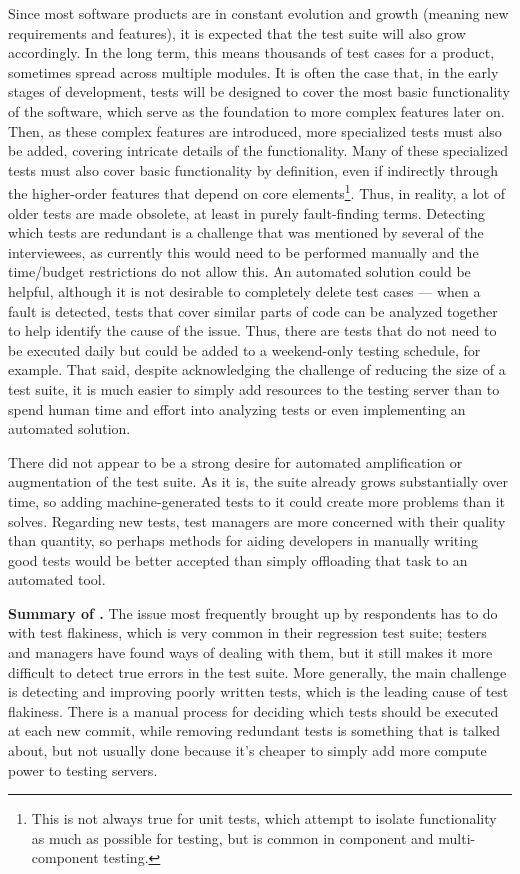 Since most software products are in constant evolution and growth (meaning new requirements and features), it is expected that the test suite will also grow accordingly.
In the long term, this means thousands of test cases for a product, sometimes spread across multiple modules.
It is often the case that, in the early stages of development, tests will be designed to cover the most basic functionality of the software, which serve as the foundation to more complex features later on.
Then, as these complex features are introduced, more specialized tests must also be added, covering intricate details of the functionality.
Many of these specialized tests must also cover basic functionality by definition, even if indirectly through the higher-order features that depend on core elements\footnote{This is not always true for unit tests, which attempt to isolate functionality as much as possible for testing, but is common in component and multi-component testing.}.
Thus, in reality, a lot of older tests are made obsolete, at least in purely fault-finding terms.
Detecting which tests are redundant is a challenge that was mentioned by several of the interviewees, as currently this would need to be performed manually and the time/budget restrictions do not allow this.
An automated solution could be helpful, although it is not desirable to completely delete test cases --- when a fault is detected, tests that cover similar parts of code can be analyzed together to help identify the cause of the issue.
Thus, there are tests that do not need to be executed daily but could be added to a weekend-only testing schedule, for example.
That said, despite acknowledging the challenge of reducing the size of a test suite, it is much easier to simply add resources to the testing server than to spend human time and effort into analyzing tests or even implementing an automated solution.

There did not appear to be a strong desire for automated amplification or augmentation of the test suite.
As it is, the suite already grows substantially over time, so adding machine-generated tests to it could create more problems than it solves.
Regarding new tests, test managers are more concerned with their quality than quantity, so perhaps methods for aiding developers in manually writing good tests would be better accepted than simply offloading that task to an automated tool.

\begin{tcolorbox}%
\textbf{Summary of .} The issue most frequently brought up by respondents has to do with test flakiness, which is very common in their regression test suite; testers and managers have found ways of dealing with them, but it still makes it more difficult to detect true errors in the test suite.
More generally, the main challenge is detecting and improving poorly written tests, which is the leading cause of test flakiness.
There is a manual process for deciding which tests should be executed at each new commit, while removing redundant tests is something that is talked about, but not usually done because it's cheaper to simply add more compute power to testing servers.
\end{tcolorbox}

